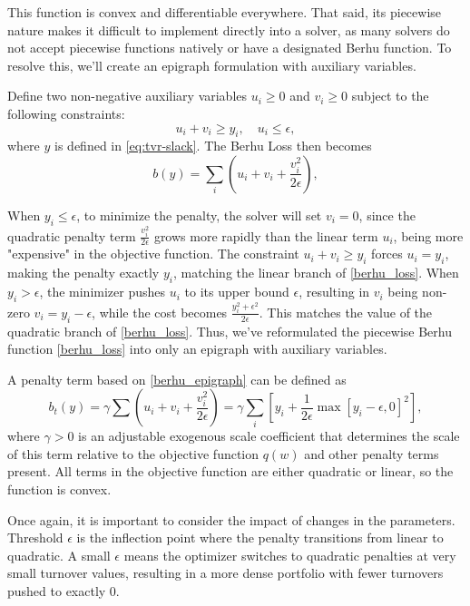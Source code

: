 \documentclass[11pt, letterpaper]{article}
\begin{document}
This function is convex and differentiable everywhere. That said, its piecewise nature makes it difficult to implement directly
into a solver, as many solvers do not accept piecewise functions natively or have a designated Berhu function.  To resolve this,
we'll create an epigraph formulation with auxiliary variables.

Define two non-negative auxiliary variables $u_i \geq 0$ and $v_i \geq 0$ subject to the following constraints:
\begin{equation*}
	u_i + v_i \geq y_i, \quad u_i \leq \epsilon,
\end{equation*}
where $y$ is defined in \eqref{eq:tvr-slack}.  The Berhu Loss then becomes
\begin{equation}
    \label{berhu_epigraph}
	b(y) = \sum_i \left(u_i + v_i + \frac{v_i^2}{2\epsilon}\right),
\end{equation}

When $y_i \leq \epsilon$, to minimize the penalty, the solver will set $v_i = 0$, since the quadratic penalty term
$\frac{v_i^2}{2\epsilon}$ grows more rapidly than the linear term $u_i$, being more "expensive" in the objective function. The
constraint $u_i + v_i \geq y_i$ forces $u_i = y_i$, making the penalty exactly $y_i$, matching the linear branch of
\eqref{berhu_loss}. When $y_i > \epsilon$, the minimizer pushes $u_i$ to its upper bound $\epsilon$, resulting in $v_i$ being
non-zero $v_i = y_i - \epsilon$, while the cost becomes $\frac{y_i^2 + \epsilon ^ 2}{2\epsilon}$. This matches the value of the
quadratic branch of \eqref{berhu_loss}. Thus, we've reformulated the piecewise Berhu function \eqref{berhu_loss} into only an
epigraph with auxiliary variables.

A penalty term based on \eqref{berhu_epigraph} can be defined as
\begin{equation}
	b_t(y) = \gamma \sum \left(u_i + v_i + \frac{v_i^2}{2\epsilon}\right) = \gamma \sum_i{\left[y_i + \frac{1}{2\epsilon}\max[y_i - \epsilon, 0]^2\right]},
\end{equation}
where $\gamma > 0$ is an adjustable exogenous scale coefficient that determines the scale of this term relative to the objective
function $q(w)$ and other penalty terms present. All terms in the objective function are either quadratic or linear, so the
function is convex.

Once again, it is important to consider the impact of changes in the parameters. Threshold $\epsilon$ is the inflection point where the
penalty transitions from linear to quadratic. A small $\epsilon$ means the optimizer switches to quadratic penalties at very small turnover values,
resulting in a more dense portfolio with fewer turnovers pushed to exactly $0$.
\end{document}
